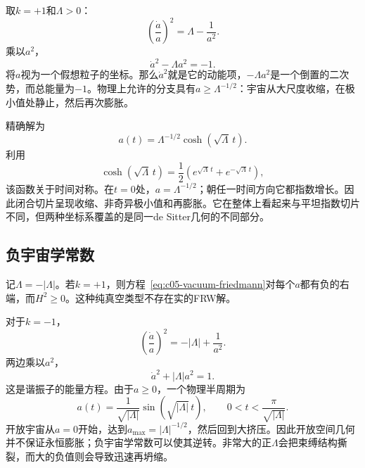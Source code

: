 取\(k=+1\)和\(\Lambda>0\)：
\begin{equation}
\left(\frac{\dot a}{a}\right)^2=\Lambda-\frac{1}{a^2}.
\label{eq:c05-closed-vacuum}
\end{equation}
乘以\(a^2\)，
\begin{equation}
\dot a^2-\Lambda a^2=-1.
\label{eq:c05-inverted-oscillator}
\end{equation}
将\(a\)视为一个假想粒子的坐标。那么\(\dot a^2\)就是它的动能项，\(-\Lambda a^2\)是一个倒置的二次势，而总能量为\(-1\)。物理上允许的分支具有\(a\geq\Lambda^{-1/2}\)：宇宙从大尺度收缩，在极小值处静止，然后再次膨胀。

精确解为
\begin{equation}
a(t)=\Lambda^{-1/2}\cosh(\sqrt{\Lambda}\,t).
\label{eq:c05-closed-desitter}
\end{equation}
利用
\begin{equation}
\cosh(\sqrt{\Lambda}\,t)
=
\frac12\left(e^{\sqrt{\Lambda}\,t}+e^{-\sqrt{\Lambda}\,t}\right),
\end{equation}
该函数关于时间对称。在\(t=0\)处，\(a=\Lambda^{-1/2}\)；朝任一时间方向它都指数增长。因此闭合切片呈现收缩、非奇异极小值和再膨胀。它在整体上看起来与平坦指数切片不同，但两种坐标系覆盖的是同一de Sitter几何的不同部分。

\subsection{负宇宙学常数}

记\(\Lambda=-|\Lambda|\)。若\(k=+1\)，则方程~\eqref{eq:c05-vacuum-friedmann}对每个\(a\)都有负的右端，而\(H^2\geq0\)。这种纯真空类型不存在实的FRW解。

对于\(k=-1\)，
\begin{equation}
\left(\frac{\dot a}{a}\right)^2=-|\Lambda|+\frac{1}{a^2}.
\end{equation}
两边乘以\(a^2\)，
\begin{equation}
\dot a^2+|\Lambda|a^2=1.
\label{eq:c05-negative-lambda-oscillator}
\end{equation}
这是谐振子的能量方程。由于\(a\geq0\)，一个物理半周期为
\begin{equation}
a(t)=\frac{1}{\sqrt{|\Lambda|}}
\sin\!\left(\sqrt{|\Lambda|}\,t\right),
\qquad
0<t<\frac{\pi}{\sqrt{|\Lambda|}}.
\end{equation}
开放宇宙从\(a=0\)开始，达到\(a_{\max}=|\Lambda|^{-1/2}\)，然后回到大挤压。因此开放空间几何并不保证永恒膨胀；负宇宙学常数可以使其逆转。非常大的正\(\Lambda\)会把束缚结构撕裂，而大的负值则会导致迅速再坍缩。


